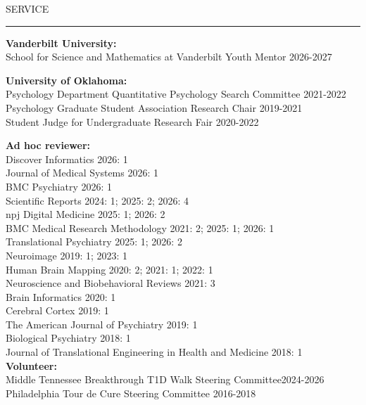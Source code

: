\documentclass{resume} %
\renewenvironment{rSection}[1]{
	\sectionskip
	\textcolor{CarnegieMellonRed}{\MakeUppercase{#1}}
	\sectionlineskip
	\hrule
	\begin{list}{}{
			\setlength{\leftmargin}{1.5em}
		}
		\item[]
	}{
	\end{list}
}
\begin{document}
	\begin{rSection}{Service}
		\textbf{Vanderbilt University:} \\
		School for Science and Mathematics at Vanderbilt Youth Mentor \hfill2026-2027
		
		\textbf{University of Oklahoma:} \\
		Psychology Department Quantitative Psychology Search Committee \hfill2021-2022 \\
		Psychology Graduate Student Association Research Chair \hfill2019-2021 \\
		Student Judge for Undergraduate Research Fair \hfill2020-2022
		
		\textbf{Ad hoc reviewer:}\\
		Discover Informatics \hfill 2026: 1\\
		Journal of Medical Systems \hfill 2026: 1\\
		BMC Psychiatry \hfill2026: 1\\
		Scientific Reports \hfill2024: 1; 2025: 2; 2026: 4\\
		npj Digital Medicine \hfill 2025: 1; 2026: 2\\ 
		BMC Medical Research Methodology \hfill 2021: 2; 2025: 1; 2026: 1\\
		Translational Psychiatry \hfill 2025: 1; 2026: 2\\
		Neuroimage \hfill2019: 1; 2023: 1 \\
		Human Brain Mapping \hfill2020: 2; 2021: 1; 2022: 1 \\
		Neuroscience and Biobehavioral Reviews \hfill2021: 3 \\
		Brain Informatics \hfill2020: 1 \\
		Cerebral Cortex \hfill2019: 1 \\
		The American Journal of Psychiatry \hfill2019: 1 \\
		Biological Psychiatry \hfill2018: 1 \\
		Journal of Translational Engineering in Health and Medicine \hfill2018: 1 \\
		
		\textbf{Volunteer:}\\
		Middle Tennessee Breakthrough T1D Walk Steering Committee\hfill 2024-2026\\
		Philadelphia Tour de Cure Steering Committee \hfill2016-2018
	\end{rSection}
	
\end{document}
